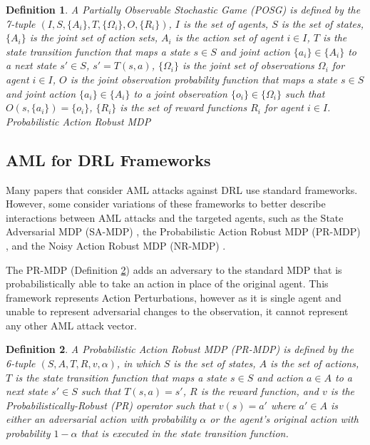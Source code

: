 \documentclass[conference,compsoc]{IEEEtran}
\newtheorem{definition}{Definition}
\begin{document}
\begin{definition}
A Partially Observable Stochastic Game (POSG) is defined by the 7-tuple $(I, S, \{A_i\}, T, \{\Omega_i\}, O, \{R_i\})$, $I$ is the set of agents, $S$ is the set of states, $\{A_i\}$ is the joint set of action sets, $A_i$ is the action set of agent $i \in I$, $T$ is the state transition function that maps a state $s \in S$ and joint action $\{a_i\} \in \{A_i\}$ to a next state $s' \in S$, $s' = T(s, a)$, $\{\Omega_i\}$ is the joint set of observations $\Omega_i$ for agent $i \in I$, $O$ is the joint observation probability function that maps a state $s \in S$ and joint action $\{a_i\} \in \{A_i\}$ to a joint observation $\{o_i\} \in \{\Omega_i\}$ such that $O(s, \{a_i\}) = \{o_i\}$, $\{R_i\}$ is the set of reward functions $R_i$ for agent $i \in I$.
\label{def:posg}Probabilistic Action Robust
MDP

\end{definition}



\subsection{AML for DRL Frameworks}
\label{sec:aml_model}
Many  papers that consider AML attacks against DRL use standard frameworks. However,  some  consider variations of these frameworks to better describe  interactions between AML attacks and the targeted agents, such as  the State Adversarial MDP (SA-MDP) \cite{zhang_robust_2020-1}, the Probabilistic Action Robust MDP (PR-MDP) \cite{tessler_action_2019}, and the Noisy Action Robust MDP (NR-MDP) \cite{tessler_action_2019}.

The PR-MDP \cite{tessler_action_2019} (Definition \ref{def:pr_mdp}) adds an adversary to the standard MDP that is probabilistically able to take an action in place of the original agent. This framework represents Action Perturbations, however as it is single agent and unable to represent adversarial changes to the observation, it cannot represent any other AML attack vector.

\begin{definition}
A Probabilistic Action Robust MDP (PR-MDP) is defined by the 6-tuple $(S, A, T, R, v, \alpha)$, in which $S$ is the set of states, $A$ is the set of actions, $T$ is the state transition function that maps a state $s \in S$ and action $a \in A$ to a next state $s' \in S$ such that $T(s, a) = s'$, $R$ is the reward function, and $v$ is the Probabilistically-Robust (PR) operator such that $v(s) = a'$ where $a' \in A$ is either an adversarial action with probability $\alpha$ or the agent's original action with probability $1-\alpha$ that is executed in the state transition function.
\label{def:pr_mdp}
\end{definition}
\end{document}
